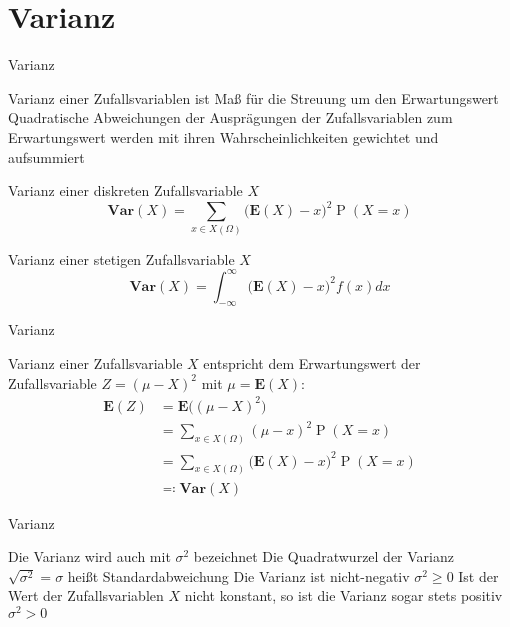 \documentclass[mathserif]{beamer}
\DeclareMathOperator{\Prob}{P}
\begin{document}
\section{Varianz}
\begin{frame}{Varianz}
    \begin{outline}
        \1 Varianz einer Zufallsvariablen ist Maß für die Streuung um den Erwartungswert
        \1 Quadratische Abweichungen der Ausprägungen der Zufallsvariablen zum Erwartungswert werden mit ihren Wahrscheinlichkeiten gewichtet und aufsummiert
    \end{outline}
    \begin{block}{Varianz einer diskreten Zufallsvariable $X$}
        \[\mathbf{Var}(X)=\sum_{x\in X(\Omega)}\Big(\mathbf{E}(X)-x\Big)^2\Prob(X=x)\]
    \end{block}
    \begin{block}{Varianz einer stetigen Zufallsvariable $X$}
        \[\mathbf{Var}(X)=\int_{-\infty}^{\infty}\Big(\mathbf{E}(X)-x\Big)^2f(x)dx\]
    \end{block}
\end{frame}
\begin{frame}{Varianz}
    \begin{outline}
        \1 Varianz einer Zufallsvariable $X$ entspricht dem Erwartungswert der Zufallsvariable $Z=(\mu-X)^2$ mit $\mu=\mathbf{E}(X)$:\begin{align*}
            \mathbf{E}(Z)&=\mathbf{E}\Big((\mu-X)^2\Big)\\
            &=\sum_{x\in X(\Omega)}(\mu-x)^2\Prob(X=x)\\
            &=\sum_{x\in X(\Omega)}\Big(\mathbf{E}(X)-x\Big)^2\Prob(X=x)\\
            &\eqqcolon\mathbf{Var}(X)
        \end{align*}
    \end{outline}
\end{frame}
\begin{frame}{Varianz}
    \begin{outline}
        \1 Die Varianz wird auch mit $\sigma^2$ bezeichnet
        \1 Die Quadratwurzel der Varianz $\sqrt{\sigma^2}=\sigma$ heißt Standardabweichung
        \1 Die Varianz ist nicht-negativ $\sigma^2\geq0$
        \2 Ist der Wert der Zufallsvariablen $X$ nicht konstant, so ist die Varianz sogar stets positiv $\sigma^2>0$
    \end{outline}
\end{frame}
\end{document}
